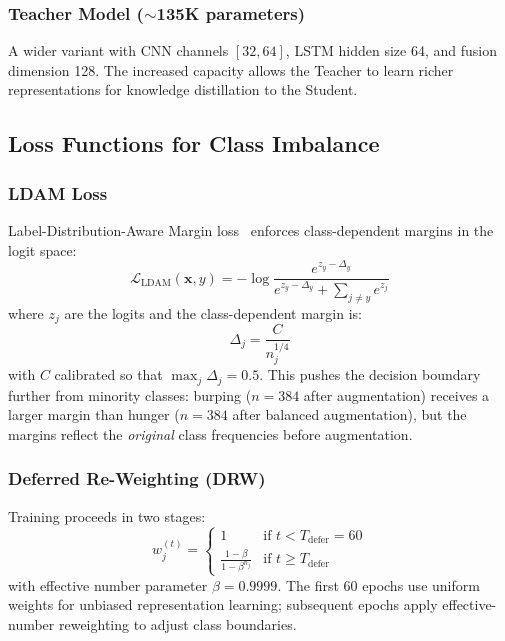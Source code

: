 \documentclass[11pt,a4paper]{article}
\begin{document}
\subsubsection{Teacher Model ($\sim$135K parameters)}

A wider variant with CNN channels $[32, 64]$, LSTM hidden size 64,
and fusion dimension 128. The increased capacity allows the Teacher
to learn richer representations for knowledge distillation to the
Student.

\subsection{Loss Functions for Class Imbalance}
\label{sec:loss}

\subsubsection{LDAM Loss}

Label-Distribution-Aware Margin loss~\cite{cao2019ldam} enforces
class-dependent margins in the logit space:
\begin{equation}
  \mathcal{L}_{\text{LDAM}}(\mathbf{x}, y) = -\log
  \frac{e^{z_y - \Delta_y}}{e^{z_y - \Delta_y} + \sum_{j \neq y} e^{z_j}}
  \label{eq:ldam}
\end{equation}
where $z_j$ are the logits and the class-dependent margin is:
\begin{equation}
  \Delta_j = \frac{C}{n_j^{1/4}}
  \label{eq:margin}
\end{equation}
with $C$ calibrated so that $\max_j \Delta_j = 0.5$. This pushes
the decision boundary further from minority classes: burping
($n = 384$ after augmentation) receives a larger margin than hunger
($n = 384$ after balanced augmentation), but the margins reflect the
\textit{original} class frequencies before augmentation.

\subsubsection{Deferred Re-Weighting (DRW)}

Training proceeds in two stages:
\begin{equation}
  w_j^{(t)} = \begin{cases}
    1 & \text{if } t < T_{\text{defer}} = 60 \\
    \frac{1 - \beta}{1 - \beta^{n_j}} & \text{if } t \geq T_{\text{defer}}
  \end{cases}
  \label{eq:drw}
\end{equation}
with effective number parameter $\beta = 0.9999$. The first 60 epochs
use uniform weights for unbiased representation learning; subsequent
epochs apply effective-number reweighting to adjust class boundaries.
\end{document}
